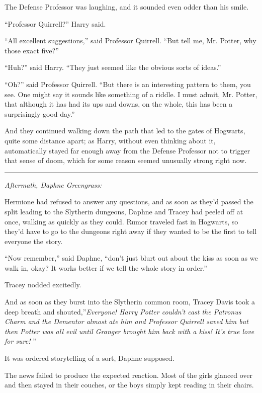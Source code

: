 The Defense Professor was laughing, and it sounded even odder than his
smile.

``Professor Quirrell?'' Harry said.

``All excellent suggestions,'' said Professor Quirrell. ``But tell me,
Mr. Potter, why those exact five?''

``Huh?'' said Harry. ``They just seemed like the obvious sorts of
ideas.''

``Oh?'' said Professor Quirrell. ``But there is an interesting pattern
to them, you see. One might say it sounds like something of a riddle. I
must admit, Mr. Potter, that although it has had its ups and downs, on
the whole, this has been a surprisingly good day.''

And they continued walking down the path that led to the gates of
Hogwarts, quite some distance apart; as Harry, without even thinking
about it, automatically stayed far enough away from the Defense
Professor not to trigger that sense of doom, which for some reason
seemed unusually strong right now.

\begin{center}\rule{3in}{0.4pt}\end{center}

\emph{Aftermath, Daphne Greengrass:}

Hermione had refused to answer any questions, and as soon as they'd
passed the split leading to the Slytherin dungeons, Daphne and Tracey
had peeled off at once, walking as quickly as they could. Rumor traveled
fast in Hogwarts, so they'd have to go to the dungeons right away if
they wanted to be the first to tell everyone the story.

``Now remember,'' said Daphne, ``don't just blurt out about the kiss as
soon as we walk in, okay? It works better if we tell the whole story in
order.''

Tracey nodded excitedly.

And as soon as they burst into the Slytherin common room, Tracey Davis
took a deep breath and shouted,''\emph{Everyone! Harry Potter couldn't
cast the Patronus Charm and the Dementor almost ate him and Professor
Quirrell saved him but then Potter was all evil until Granger brought
him back with a kiss! It's true love for sure!} ''

It was ordered storytelling of a sort, Daphne supposed.

The news failed to produce the expected reaction. Most of the girls
glanced over and then stayed in their couches, or the boys simply kept
reading in their chairs.

